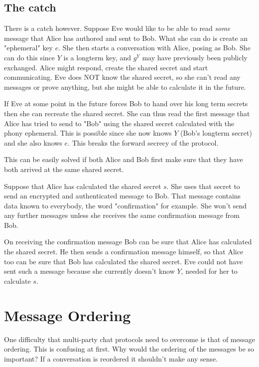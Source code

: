 \subsection{The catch}

There is a catch however. Suppose Eve would like to be able to read \emph{some} message that Alice has authored and sent to Bob. What she can do is create an "ephemeral" key $e$. She then starts a conversation with Alice, posing as Bob. She can do this since $Y$ is a longterm key, and $g^Y$ may have previously been publicly exchanged. Alice might respond, create the shared secret and start communicating. Eve does NOT know the shared secret, so she can't read any messages or prove anything, but she might be able to calculate it in the future.

If Eve at some point in the future forces Bob to hand over his long term secrets then she can recreate the shared secret. She can thus read the first message that Alice has tried to send to "Bob" using the shared secret calculated with the phony ephemeral. This is possible since she now knows $Y$ (Bob's longterm secret) and she also knows $e$. This breaks the forward secrecy of the protocol.

This can be easily solved if both Alice and Bob first make sure that they have both arrived at the same shared secret.

Suppose that Alice has calculated the shared secret $s$. She uses that secret to send an encrypted and authenticated message to Bob. That message contains data known to everybody, the word "confirmation" for example. She won't send any further messages unless she receives the same confirmation message from Bob.

On receiving the confirmation message Bob can be sure that Alice has calculated the shared secret.
He then sends a confirmation message himself, so that Alice too can be sure that Bob has calculated the shared secret. Eve could not have sent such a message because she currently doesn't know $Y$, needed for her to calculate $s$.

\section{Message Ordering}
\label{sections:message_ordering}

One difficulty that multi-party chat protocols need to overcome is that of message ordering.
This is confusing at first.
Why would the ordering of the messages be so important?
If a conversation is reordered it shouldn't make any sense.

